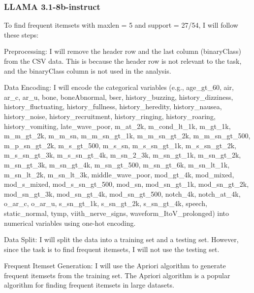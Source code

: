 \documentclass[12pt]{article}
\begin{document}
\newpage

\subsubsection{LLAMA 3.1-8b-instruct}
\begin{mdframed}

To find frequent itemsets with maxlen = 5 and support = 27/54, I will follow these steps:
\newline

    Preprocessing: I will remove the header row and the last column (binaryClass) from the CSV data. This is because the header row is not relevant to the task, and the binaryClass column is not used in the analysis.
\newline

    Data Encoding: I will encode the categorical variables (e.g., age\_gt\_60, air, ar\_c, ar\_u, bone, boneAbnormal, bser, history\_buzzing, history\_dizziness, history\_fluctuating, history\_fullness, history\_heredity, history\_nausea, history\_noise, history\_recruitment, history\_ringing, history\_roaring, history\_vomiting, late\_wave\_poor, m\_at\_2k, m\_cond\_lt\_1k, m\_gt\_1k, m\_m\_gt\_2k, m\_m\_sn, m\_m\_sn\_gt\_1k, m\_m\_sn\_gt\_2k, m\_m\_sn\_gt\_500, m\_p\_sn\_gt\_2k, m\_s\_gt\_500, m\_s\_sn, m\_s\_sn\_gt\_1k, m\_s\_sn\_gt\_2k, m\_s\_sn\_gt\_3k, m\_s\_sn\_gt\_4k, m\_sn\_2\_3k, m\_sn\_gt\_1k, m\_sn\_gt\_2k, m\_sn\_gt\_3k, m\_sn\_gt\_4k, m\_sn\_gt\_500, m\_sn\_gt\_6k, m\_sn\_lt\_1k, m\_sn\_lt\_2k, m\_sn\_lt\_3k, middle\_wave\_poor, mod\_gt\_4k, mod\_mixed, mod\_s\_mixed, mod\_s\_sn\_gt\_500, mod\_sn, mod\_sn\_gt\_1k, mod\_sn\_gt\_2k, mod\_sn\_gt\_3k, mod\_sn\_gt\_4k, mod\_sn\_gt\_500, notch\_4k, notch\_at\_4k, o\_ar\_c, o\_ar\_u, s\_sn\_gt\_1k, s\_sn\_gt\_2k, s\_sn\_gt\_4k, speech, static\_normal, tymp, viith\_nerve\_signs, waveform\_ItoV\_prolonged) into numerical variables using one-hot encoding.
\newline

    Data Split: I will split the data into a training set and a testing set. However, since the task is to find frequent itemsets, I will not use the testing set.
\newline

    Frequent Itemset Generation: I will use the Apriori algorithm to generate frequent itemsets from the training set. The Apriori algorithm is a popular algorithm for finding frequent itemsets in large datasets.
\newline


\end{mdframed}
\end{document}

